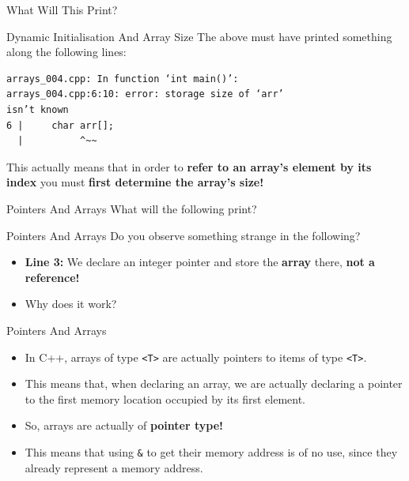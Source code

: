 \documentclass[aspectratio=169, 12pt]{beamer}
\begin{document}
	\begin{frame}{What Will This Print?}
		
	\end{frame}
	
	\begin{frame}[fragile]{Dynamic Initialisation And Array Size}
		The above must have printed something along the following lines:
		\begin{verbatim}
arrays_004.cpp: In function ‘int main()’:
arrays_004.cpp:6:10: error: storage size of ‘arr’
isn’t known
6 |     char arr[];
  |          ^~~
\end{verbatim}
		This actually means that in order to \textbf{refer to an array's element by its index} you must \textbf{first determine the array's size!}
	\end{frame}

	\begin{frame}{Pointers And Arrays}
		What will the following print?
		
	\end{frame}

	\begin{headsup}{Pointers And Arrays}
		Do you observe something strange in the following?
		\pause
		\begin{itemize}
			\item \textbf{Line 3:} We declare an integer pointer and store the \textbf{array} there, \textbf{not a reference!}\pause
			\item Why does it work?
		\end{itemize}
	\end{headsup}

	\begin{headsup}{Pointers And Arrays}
		\begin{itemize}
			\item In C++, arrays of type \texttt{<T>} are actually pointers to items of type \texttt{<T>}.
			\item This means that, when declaring an array, we are actually declaring a pointer to the first memory location occupied by its first element.
			\item So, arrays are actually of \textbf{pointer type!}
			\item This means that using \texttt{\&} to get their memory address is of no use, since they already represent a memory address.
		\end{itemize}
	\end{headsup}
	
\end{document}
